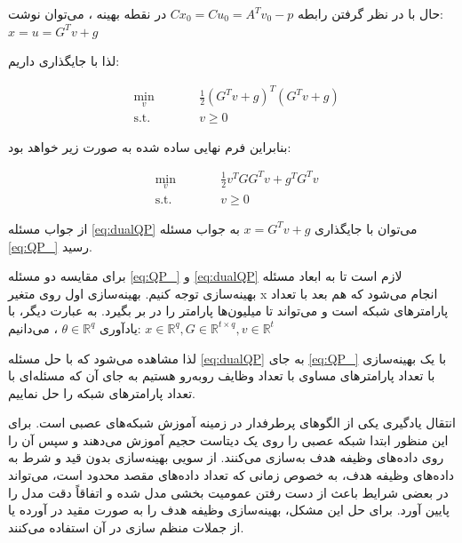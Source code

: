 \documentclass{article}
\begin{document}
حال با در نظر گرفتن رابطه 
$Cx_0 = Cu_0 = A^Tv_0-p$
در نقطه بهینه
،
می‌توان نوشت:
$x=u=G^Tv+g$

لذا با جایگذاری داریم:

\begin{subequations}
\begin{alignat}{2}
&\!\min_{v}        &\qquad& \frac{1}{2} (G^Tv+g)^T(G^Tv+g)\\
&\text{s.t.} &      & v \geq 0
\end{alignat}
\end{subequations}

بنابراین فرم نهایی ساده شده به صورت زیر خواهد بود:

\begin{subequations}\label{eq:dualQP}
\begin{alignat}{2}
&\!\min_{v}        &\qquad& \frac{1}{2} v^TGG^Tv+g^TG^Tv\\
&\text{s.t.} &      & v \geq 0
\end{alignat}
\end{subequations}

از جواب مسئله 
\ref{eq:dualQP}
می‌توان با جایگذاری
$x = G^Tv+g$
به جواب مسئله 
\ref{eq:QP_}
رسید.

برای مقایسه
دو مسئله
\ref{eq:QP_}
و
\ref{eq:dualQP}
لازم است تا به ابعاد مسئله بهینه‌سازی توجه کنیم.
بهینه‌سازی اول روی متغیر 
x
انجام می‌شود که هم بعد با تعداد پارامترهای شبکه است و می‌تواند تا میلیون‌ها پارامتر را در بر بگیرد.
به عبارت دیگر، با یادآوری 
$\theta \in \mathbb{R}^q$
،
می‌دانیم:
$x \in \mathbb{R}^q, G \in \mathbb{R}^{t\times q}, v \in \mathbb{R}^t$

لذا مشاهده می‌شود که با حل مسئله
\ref{eq:dualQP}
به جای 
\ref{eq:QP_}
با یک بهینه‌سازی با تعداد پارامتر‌های مساوی با تعداد وظایف روبه‌رو هستیم به جای آن که مسئله‌ای با تعداد پارامترهای شبکه را حل نماییم.

\fi

انتقال یادگیری
یکی از الگوهای پرطرفدار در زمینه آموزش شبکه‌های عصبی است. برای این منظور ابتدا شبکه عصبی را روی یک دیتاست حجیم آموزش می‌دهند و سپس 
آن را روی داده‌های وظیفه هدف به‌سازی 
می‌کنند.
از سویی
بهینه‌سازی بدون قید و شرط به داده‌های وظیفه هدف، به خصوص زمانی که تعداد داده‌های مقصد محدود است، می‌تواند در بعضی شرایط باعث
از دست رفتن عمومیت بخشی 
مدل شده و اتفاقاً دقت مدل را پایین آورد.
برای حل این مشکل، بهینه‌سازی وظیفه هدف را به صورت 
مقید در آورده یا از جملات منظم سازی در آن استفاده می‌کنند.
\end{document}

